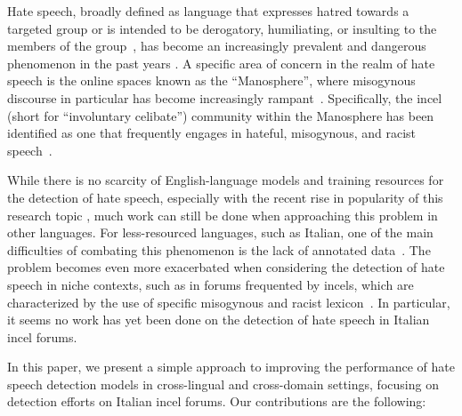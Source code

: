 \documentclass[11pt]{article}
\begin{document}
Hate speech, broadly defined as language that expresses hatred towards a targeted group or is intended to be derogatory, humiliating, or insulting to the members of the group~\cite{davidson-2017-automated-hate}, has become an increasingly prevalent and dangerous phenomenon in the past years \cite{matamoros-fernandezRacismHateSpeech2021}.
 A specific area of concern in the realm of hate speech is the online spaces known as the ``Manosphere'', where misogynous discourse in particular has become increasingly rampant~\cite{ribeiro2021evolution-manosphere}.
Specifically, the incel (short for ``involuntary celibate'') community within the Manosphere has been identified as one that frequently engages in hateful, misogynous, and racist speech~\cite{nagle-2017-kill-normies,jakiOnlineHatredWomen2019}.

While there is no scarcity of English-language models and training resources for 
the detection of hate speech, especially with the recent rise in popularity of 
this research topic \cite{alkomahLiteratureReviewTextual2022}, 
much work can still be done when approaching this problem in other languages.
For less-resourced languages, such as Italian, one of the main difficulties of combating this phenomenon is the lack of annotated data~\cite{van2023mitigating}. The problem becomes even more 
exacerbated when considering the detection of hate speech in niche contexts, 
such as in forums frequented by incels, which are characterized by the use of 
specific misogynous and racist lexicon~\cite{gothard2020ExploringIncelLanguage}. In particular, it seems no work has yet been done on the detection of hate speech in Italian incel forums.

In this paper, we present a simple approach to improving the performance of hate speech detection models in cross-lingual and cross-domain settings, focusing on detection efforts on Italian incel forums. Our contributions are the following:
\end{document}
